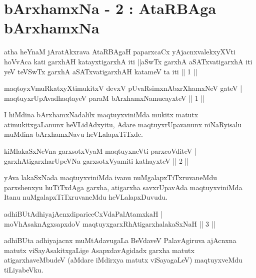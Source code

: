
\chapter{bArxhamxNa - 2 : AtaRBAga bArxhamxNa}


\begin{kandikeshl}
atha heYnaM jAratAkxrava AtaRBAgaH paparxcaCx yAjacnxvalekxyXVti hoVvAca kati garxhAH katayxtigarxhA iti ||aSwTx garxhA aSATxvatigarxhA iti yeV teV\s SwTx garxhA aSATxvatigarxhAH katameV ta iti || 1 ||
\end{kandikeshl}


\begin{shl}
maqtoyxVmuRkatxyXtimukitxV devxV pUvaRsimxnAbxrXhamxNeV gateV |\\
maqtuyxrUpAvadhaqtayeV paraM bArxhamxNamucayxteV \hfill || 1 || 
\end{shl}	

\begin{artha}
I hiMdina bArxhamxNadalilx maqtuyxviniMda mukitx matutx atimukitxgaLanunx heVLidAdxyitu, Adare maqtuyxrUpavanunx niNaRyisalu muMdina bArxhamxNavu heVLalapxTiTxde.
\end{artha}

\begin{shl}
kiMlakaSxNeVna garxsotxV\s yaM maqtuyxneVti parxcoVditeV |\\
garxhAtigarxharUpeVNa garxsotxV\s yamiti kathayxteV \hfill || 2 || 
\end{shl}

\begin{artha}
yAva lakaSxNada maqtuyxviniMda ivanu nuMgalapxTiTxruvaneMdu parxshenxyu huTiTxdAga garxha, atigarxha savxrUpavAda maqtuyxviniMda Itanu nuMgalapxTiTxruvaneMdu heVLalapxDuvudu.
\end{artha}

\begin{shl}
adhiBUtAdhiyajAcnxdipariceCxVdaPalAtamxkaH |\\
moVhAsaknAgxsapxdoV maqtuyxgarxRhAtigarxhalakaSxNaH \hfill || 3 ||
\end{shl}

\begin{artha}
adhiBUta adhiyajacnx muMtAdavugaLa BeVdaveV PalavAgiruva ajAcnxna matutx viSayAsakitxgaLige AsapxdavAgidadx garxha matutx atigarxhaveMbudeV (aMdare iMdirxya matutx viSayagaLeV) maqtuyxveMdu tiLiyabeVku.
\end{artha}

